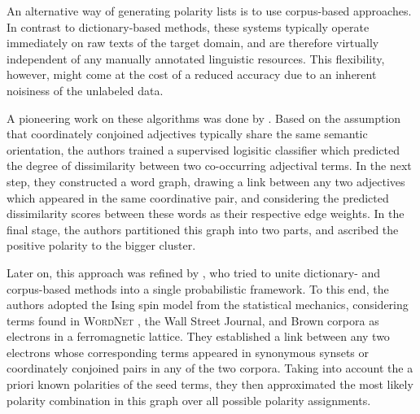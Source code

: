 An alternative way of generating polarity lists is to use corpus-based
approaches.  In contrast to dictionary-based methods, these systems
typically operate immediately on raw texts of the target domain, and
are therefore virtually independent of any manually annotated
linguistic resources.  This flexibility, however, might come at the
cost of a reduced accuracy due to an inherent noisiness of the
unlabeled data.

A pioneering work on these algorithms was done by
\citet{Hatzivassi:97}.  Based on the assumption that coordinately
conjoined adjectives typically share the same semantic orientation,
the authors trained a supervised logisitic classifier which predicted
the degree of dissimilarity between two co-occurring adjectival terms.
In the next step, they constructed a word graph, drawing a link
between any two adjectives which appeared in the same coordinative
pair, and considering the predicted dissimilarity scores between these
words as their respective edge weights.  In the final stage, the
authors partitioned this graph into two parts, and ascribed the
positive polarity to the bigger cluster.

Later on, this approach was refined by \citet{Takamura:05}, who tried
to unite dictionary- and corpus-based methods into a single
probabilistic framework.  To this end, the authors adopted the Ising
spin model from the statistical mechanics, considering terms found in
\textsc{WordNet} \cite{Miller:95}, the Wall Street Journal, and Brown
corpora as electrons in a ferromagnetic lattice.  They established a
link between any two electrons whose corresponding terms appeared in
synonymous synsets or coordinately conjoined pairs in any of the two
corpora.  Taking into account the a priori known polarities of the
seed terms, they then approximated the most likely polarity
combination in this graph over all possible polarity assignments.


